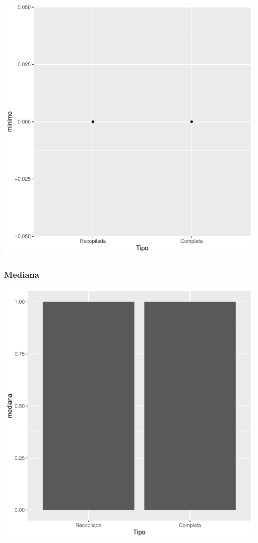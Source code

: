 \documentclass{article}
\begin{document}
\includegraphics{seguimento2-090}

\subsubsection{Mediana}

\includegraphics{seguimento2-091}
\end{document}
